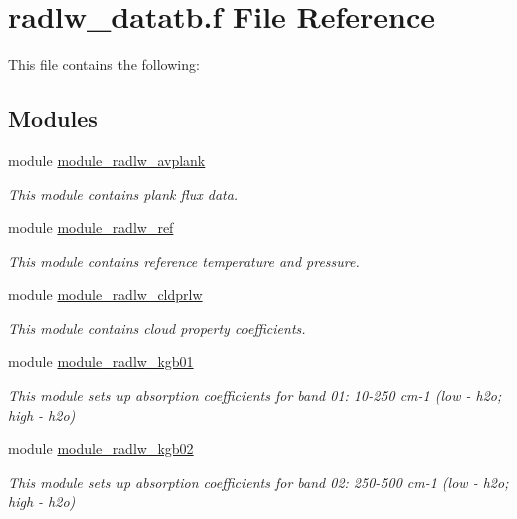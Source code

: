 \hypertarget{radlw__datatb_8f}{}\section{radlw\+\_\+datatb.\+f File Reference}
\label{radlw__datatb_8f}


This file contains the following\+:  


\subsection*{Modules}
\begin{DoxyCompactItemize}
\item 
module \hyperlink{namespacemodule__radlw__avplank}{module\+\_\+radlw\+\_\+avplank}
\begin{DoxyCompactList}\small\item\em This module contains plank flux data. \end{DoxyCompactList}\item 
module \hyperlink{namespacemodule__radlw__ref}{module\+\_\+radlw\+\_\+ref}
\begin{DoxyCompactList}\small\item\em This module contains reference temperature and pressure. \end{DoxyCompactList}\item 
module \hyperlink{namespacemodule__radlw__cldprlw}{module\+\_\+radlw\+\_\+cldprlw}
\begin{DoxyCompactList}\small\item\em This module contains cloud property coefficients. \end{DoxyCompactList}\item 
module \hyperlink{namespacemodule__radlw__kgb01}{module\+\_\+radlw\+\_\+kgb01}
\begin{DoxyCompactList}\small\item\em This module sets up absorption coefficients for band 01\+: 10-\/250 cm-\/1 (low -\/ h2o; high -\/ h2o) \end{DoxyCompactList}\item 
module \hyperlink{namespacemodule__radlw__kgb02}{module\+\_\+radlw\+\_\+kgb02}
\begin{DoxyCompactList}\small\item\em This module sets up absorption coefficients for band 02\+: 250-\/500 cm-\/1 (low -\/ h2o; high -\/ h2o) \end{DoxyCompactList}\item 

\end{DoxyCompactItemize}
